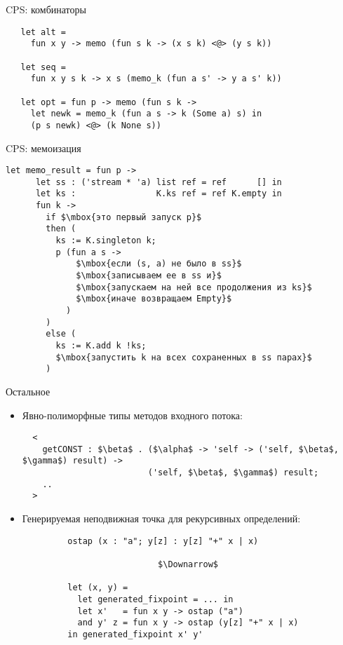 \documentclass[10pt, mathserif]{beamer}
\theoremstyle{definition}
\begin{document}
\begin{frame}[fragile]{CPS: комбинаторы}

  \begin{lstlisting}
   let alt =
     fun x y -> memo (fun s k -> (x s k) <@> (y s k))

   let seq =
     fun x y s k -> x s (memo_k (fun a s' -> y a s' k))

   let opt = fun p -> memo (fun s k ->
     let newk = memo_k (fun a s -> k (Some a) s) in
     (p s newk) <@> (k None s))

  \end{lstlisting}

\end{frame}

\begin{frame}[fragile]{CPS: мемоизация}

  \begin{lstlisting}[basicstyle=\small]
    let memo_result = fun p ->
      let ss : ('stream * 'a) list ref = ref      [] in
      let ks :                K.ks ref = ref K.empty in
      fun k ->
        if $\mbox{это первый запуск p}$
        then (
          ks := K.singleton k;
          p (fun a s ->
              $\mbox{если (s, a) не было в ss}$
              $\mbox{записываем ее в ss и}$
              $\mbox{запускаем на ней все продолжения из ks}$
              $\mbox{иначе возвращаем Empty}$
            )
        )
        else (
          ks := K.add k !ks;
          $\mbox{запустить k на всех сохраненных в ss парах}$
        )
  \end{lstlisting}

\end{frame}

\begin{frame}[fragile]{Остальное}

  \begin{itemize}
     \item Явно-полиморфные типы методов входного потока:

       \begin{lstlisting}
  <
    getCONST : $\beta$ . ($\alpha$ -> 'self -> ('self, $\beta$, $\gamma$) result) ->
                         ('self, $\beta$, $\gamma$) result;
    ..
  >
       \end{lstlisting}

     \item Генерируемая неподвижная точка для рекурсивных определений:

       \begin{lstlisting}
         ostap (x : "a"; y[z] : y[z] "+" x | x)

                           $\Downarrow$

         let (x, y) =
           let generated_fixpoint = ... in
           let x'   = fun x y -> ostap ("a")
           and y' z = fun x y -> ostap (y[z] "+" x | x)
         in generated_fixpoint x' y'
       \end{lstlisting}

  \end{itemize}

\end{frame}
\end{document}
